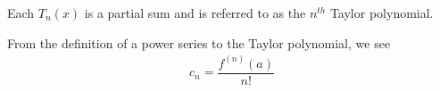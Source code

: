 \begin{note}
Each $T_{n}(x)$ is a partial sum and is referred to as the $n^{th}$ Taylor polynomial.
\end{note}

\begin{note}
From the definition of a power series to the Taylor polynomial, we see
\begin{align*}
    c_{n} = \dfrac{f^{(n)}(a)}{n!}
\end{align*}
\end{note}
